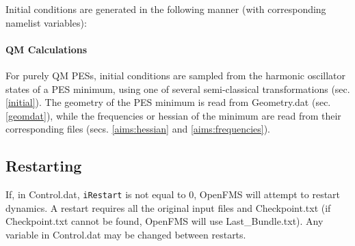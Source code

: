 \documentclass[11pt]{article}
\newcommand\bfec[1]{\textcolor{orange}{\textit{ XXX BFEC: #1 XXX }}}
\begin{document}
Initial conditions are generated in the following manner (with corresponding namelist variables):

\paragraph{QM Calculations}
For purely QM PESs, initial conditions are sampled from the harmonic oscillator states of a PES minimum, using one of several semi-classical transformations (sec. \ref{initial}). The geometry of the PES minimum is read from Geometry.dat (sec. \ref{geomdat}), while the frequencies or hessian of the minimum are read from their corresponding files (secs. \ref{aims:hessian} and \ref{aims:frequencies}).



\subsection{Restarting}
\label{restart} 

If, in Control.dat, \verb*$iRestart$ is not equal to 0, OpenFMS will attempt to restart dynamics. A restart requires all the original input files and Checkpoint.txt (if Checkpoint.txt cannot be found, OpenFMS will use Last\_Bundle.txt). Any variable in Control.dat may be changed between restarts.
\end{document}
